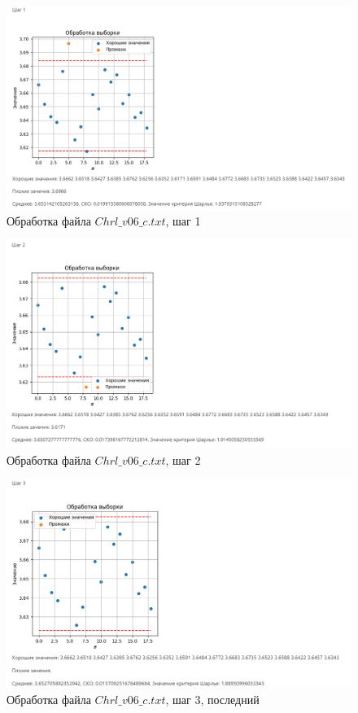 \documentclass[a4paper,14pt]{article}
\begin{document}
	\begin{figure}[H]
		\centering
		\includegraphics[width=0.95\linewidth]{images/c_1}
		\caption{Обработка файла $Chrl\_v06\_c.txt$, шаг 1}
		\label{fig:c_1}
	\end{figure}
	
	\begin{figure}[H]
		\centering
		\includegraphics[width=0.95\linewidth]{images/c_2}
		\caption{Обработка файла $Chrl\_v06\_c.txt$, шаг 2}
		\label{fig:c_2}
	\end{figure}
	
	\begin{figure}[H]
		\centering
		\includegraphics[width=0.95\linewidth]{images/c_3}
		\caption{Обработка файла $Chrl\_v06\_c.txt$, шаг 3, последний}
		\label{fig:c_3}
	\end{figure}
	
\end{document}
